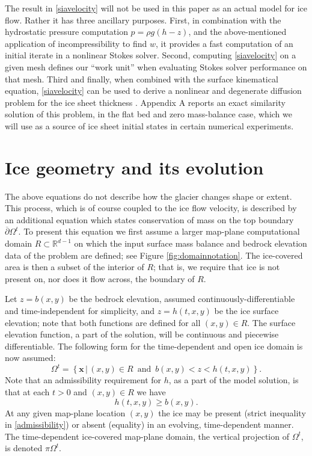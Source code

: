 \documentclass[letterpaper,final,12pt,reqno]{amsart}
\newcommand{\RR}{\mathbb{R}}
\newcommand{\bx}{\mathbf{x}}
\begin{document}
The result in \eqref{siavelocity} will not be used in this paper as an actual model for ice flow.  Rather it has three ancillary purposes.  First, in combination with the hydrostatic pressure computation $p=\rho g (h-z)$, and the above-mentioned application of incompressibility to find $w$, it provides a fast computation of an initial iterate in a nonlinear Stokes solver.  Second, computing \eqref{siavelocity} on a given mesh defines our ``work unit'' when evaluating Stokes solver performance on that mesh.  Third and finally, when combined with the surface kinematical equation, \eqref{siavelocity} can be used to derive a nonlinear and degenerate diffusion problem for the ice sheet thickness \cite{Fowler1997}.  Appendix A reports an exact similarity solution of this problem, in the flat bed and zero mass-balance case, which we will use as a source of ice sheet initial states in certain numerical experiments.


\section{Ice geometry and its evolution} \label{sec:stronggeometry}

The above equations do not describe how the glacier changes shape or extent.  This process, which is of course coupled to the ice flow velocity, is described by an additional equation which states conservation of mass on the top boundary $\overline{\partial} \Omega^t$.  To present this equation we first assume a larger map-plane computational domain $R\subset \RR^{d-1}$ on which the input surface mass balance and bedrock elevation data of the problem are defined; see Figure \ref{fig:domainnotation}.  The ice-covered area is then a subset of the interior of $R$; that is, we require that ice is not present on, nor does it flow across, the boundary of $R$.

Let $z=b(x,y)$ be the bedrock elevation, assumed continuously-differentiable and time-independent for simplicity, and $z=h(t,x,y)$ be the ice surface elevation; note that both functions are defined for all $(x,y)\in R$.  The surface elevation function, a part of the solution, will be continuous and piecewise differentiable.  The following form for the time-dependent and open ice domain is now assumed:
\begin{equation}
\Omega^t = \left\{\bx\,\big|\,(x,y)\in R \,\text{ and }\, b(x,y) < z < h(t,x,y)\right\}.  \label{Omegat}
\end{equation}
Note that an admissibility requirement \cite{Bueler2016} for $h$, as a part of the model solution, is that at each $t>0$ and $(x,y)\in R$ we have
\begin{equation}
h(t,x,y) \ge b(x,y).  \label{admissibility}
\end{equation}
At any given map-plane location $(x,y)$ the ice may be present (strict inequality in \eqref{admissibility}) or absent (equality) in an evolving, time-dependent manner.  The time-dependent ice-covered map-plane domain, the vertical projection of $\Omega^t$, is denoted $\pi \Omega^t$.
\end{document}
